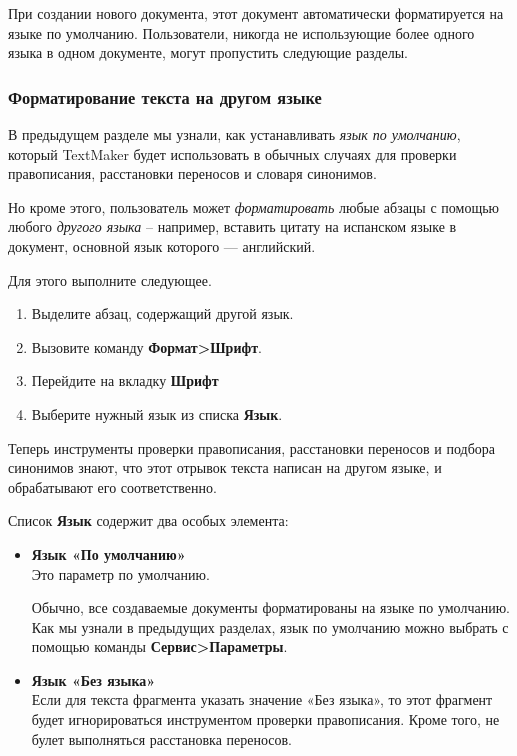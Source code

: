 ﻿\documentclass[a4paper,10pt]{article}
\begin{document}
При создании нового документа, этот документ автоматически форматируется на языке по умолчанию. Пользователи, никогда не использующие более одного языка в одном документе, могут пропустить следующие разделы.

\subsubsection{Форматирование текста на другом языке}
В предыдущем разделе мы узнали, как устанавливать \textit{язык по умолчанию}, который TextMaker будет использовать в обычных случаях для проверки правописания, расстановки переносов и словаря синонимов.

Но кроме этого, пользователь может \textit{форматировать} любые абзацы с помощью любого \textit{другого языка} -- например, вставить цитату на испанском языке в документ, основной язык которого — английский.

Для этого выполните следующее.
\begin{enumerate}
 \item Выделите абзац, содержащий другой язык.
 \item Вызовите команду \textbf{Формат>Шрифт}.
 \item Перейдите на вкладку \textbf{Шрифт}
 \item Выберите нужный язык из списка \textbf{Язык}.
\end{enumerate}

Теперь инструменты проверки правописания, расстановки переносов и подбора синонимов знают, что этот отрывок текста написан на другом языке, и обрабатывают его соответственно.

Список \textbf{Язык} содержит два особых элемента:

\begin{itemize}
 \item \textbf{Язык «По умолчанию»}\\
 Это параметр по умолчанию.
 
 Обычно, все создаваемые документы форматированы на языке по умолчанию. Как мы узнали в предыдущих разделах, язык по умолчанию можно выбрать с помощью команды \textbf{Сервис>Параметры}.
 \item \textbf{Язык «Без языка»}\\
 Если для текста фрагмента указать значение «Без языка», то этот фрагмент будет игнорироваться инструментом проверки правописания. Кроме того, не булет выполняться расстановка переносов.
\end{itemize}
\end{document}

